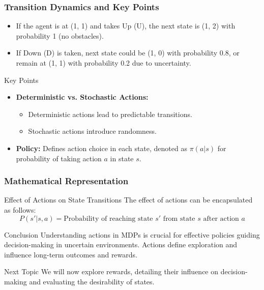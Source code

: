 \documentclass[aspectratio=169]{beamer}
\begin{document}
\begin{frame}[fragile]
    \frametitle{Transition Dynamics and Key Points}
    
    \begin{itemize}
        \item If the agent is at (1, 1) and takes Up (U), the next state is (1, 2) with probability 1 (no obstacles).
        \item If Down (D) is taken, next state could be (1, 0) with probability 0.8, or remain at (1, 1) with probability 0.2 due to uncertainty.
    \end{itemize}

    \begin{block}{Key Points}
        \begin{itemize}
            \item \textbf{Deterministic vs. Stochastic Actions:} 
                \begin{itemize}
                    \item Deterministic actions lead to predictable transitions.
                    \item Stochastic actions introduce randomness.
                \end{itemize}
            \item \textbf{Policy:} Defines action choice in each state, denoted as \( \pi(a | s) \) for probability of taking action \( a \) in state \( s \).
        \end{itemize}
    \end{block}
\end{frame}

\begin{frame}[fragile]
    \frametitle{Mathematical Representation}
    
    \begin{block}{Effect of Actions on State Transitions}
        The effect of actions can be encapsulated as follows:
        \begin{equation}
            P(s' | s, a) = \text{Probability of reaching state } s' \text{ from state } s \text{ after action } a
        \end{equation}
    \end{block}
    
    \begin{block}{Conclusion}
        Understanding actions in MDPs is crucial for effective policies guiding decision-making in uncertain environments. Actions define exploration and influence long-term outcomes and rewards.
    \end{block}
    
    \begin{block}{Next Topic}
        We will now explore rewards, detailing their influence on decision-making and evaluating the desirability of states.
    \end{block}
\end{frame}
\end{document}
